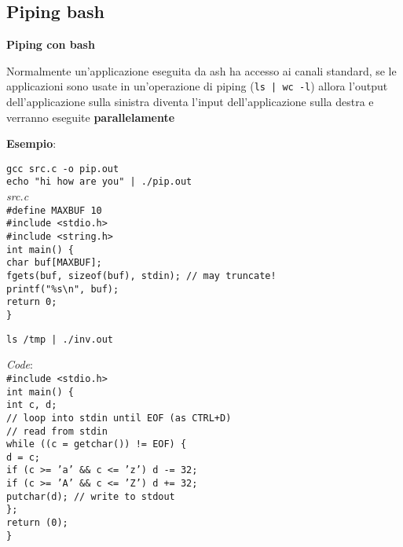 \begin{flushleft}
  \subsection{Piping bash}
  \textbf{Piping con bash}
  \begin{flushleft}
    Normalmente un'applicazione eseguita da ash ha accesso ai canali standard, se le applicazioni sono usate 
    in un'operazione di piping (\texttt{ls | wc -l}) allora l'output  dell'applicazione 
    sulla sinistra diventa l'input dell'applicazione sulla destra e verranno eseguite \textbf{parallelamente} \par 
    \textbf{Esempio}: \\
    \begin{flushleft}
      \texttt{gcc src.c -o pip.out \\
              echo "hi how are you" | ./pip.out}\\
      \textit{src.c} \\
      \texttt{\#define MAXBUF 10\\
      \#include <stdio.h>\\
      \#include <string.h>\\
      int main() \{ \\
       \halftab char buf[MAXBUF]; \\
       \halftab fgets(buf, sizeof(buf), stdin); // may truncate!\\
       \halftab printf("\%s\textbackslash n", buf); \\
       \halftab return 0; \\
      \} }
    \end{flushleft}
    \begin{flushleft}
      \texttt{ls /tmp | ./inv.out} \par 
      \textit{Code}: \\
      \texttt{\#include <stdio.h>\\
      int main() \{ \\
       \halftab int c, d; \\
       \halftab // loop into stdin until EOF (as CTRL+D) \\
       \halftab // read from stdin \\
       \halftab while ((c = getchar()) != EOF) \{ \\
       \tab d = c; \\
       \tab if (c >= 'a' \&\& c <= 'z') d -= 32; \\
       \tab if (c >= 'A' \&\& c <= 'Z') d += 32; \\
       \tab putchar(d); // write to stdout \\
       \halftab \}; \\
       \halftab return (0); \\
      \} }
    \end{flushleft}
  \end{flushleft}
\end{flushleft}